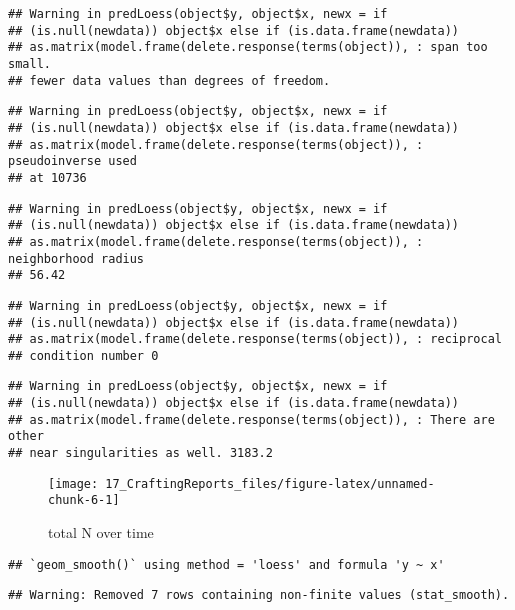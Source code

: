 \documentclass[]{article}
\begin{document}
\begin{verbatim}
## Warning in predLoess(object$y, object$x, newx = if
## (is.null(newdata)) object$x else if (is.data.frame(newdata))
## as.matrix(model.frame(delete.response(terms(object)), : span too small.
## fewer data values than degrees of freedom.
\end{verbatim}

\begin{verbatim}
## Warning in predLoess(object$y, object$x, newx = if
## (is.null(newdata)) object$x else if (is.data.frame(newdata))
## as.matrix(model.frame(delete.response(terms(object)), : pseudoinverse used
## at 10736
\end{verbatim}

\begin{verbatim}
## Warning in predLoess(object$y, object$x, newx = if
## (is.null(newdata)) object$x else if (is.data.frame(newdata))
## as.matrix(model.frame(delete.response(terms(object)), : neighborhood radius
## 56.42
\end{verbatim}

\begin{verbatim}
## Warning in predLoess(object$y, object$x, newx = if
## (is.null(newdata)) object$x else if (is.data.frame(newdata))
## as.matrix(model.frame(delete.response(terms(object)), : reciprocal
## condition number 0
\end{verbatim}

\begin{verbatim}
## Warning in predLoess(object$y, object$x, newx = if
## (is.null(newdata)) object$x else if (is.data.frame(newdata))
## as.matrix(model.frame(delete.response(terms(object)), : There are other
## near singularities as well. 3183.2
\end{verbatim}

\begin{figure}

\texttt{[image: 17\_CraftingReports\_files/figure-latex/unnamed-chunk-6-1]} \hfill{}

\caption{total N over time}\label{fig:unnamed-chunk-6}
\end{figure}

\begin{verbatim}
## `geom_smooth()` using method = 'loess' and formula 'y ~ x'
\end{verbatim}

\begin{verbatim}
## Warning: Removed 7 rows containing non-finite values (stat_smooth).
\end{verbatim}
\end{document}
